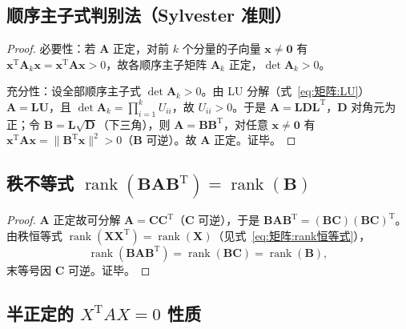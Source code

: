 \subsection*{顺序主子式判别法（Sylvester 准则）}

\begin{proof}
必要性：若 $\boldsymbol{A}$ 正定，对前 $k$ 个分量的子向量 $\boldsymbol{x}\neq\boldsymbol{0}$ 有 $\boldsymbol{x}^{\mathrm{T}}\boldsymbol{A}_k\boldsymbol{x} = \boldsymbol{x}^{\mathrm{T}}\boldsymbol{A}\boldsymbol{x} > 0$，故各顺序主子矩阵 $\boldsymbol{A}_k$ 正定，$\det\boldsymbol{A}_k > 0$。

充分性：设全部顺序主子式 $\det\boldsymbol{A}_k > 0$。由 LU 分解（式~\eqref{eq:矩阵:LU}）$\boldsymbol{A} = \boldsymbol{L}\boldsymbol{U}$，且 $\det\boldsymbol{A}_k = \prod_{i=1}^{k}U_{ii}$，故 $U_{ii}>0$。于是 $\boldsymbol{A} = \boldsymbol{L}\boldsymbol{D}\boldsymbol{L}^{\mathrm{T}}$，$\boldsymbol{D}$ 对角元为正；令 $\boldsymbol{B} = \boldsymbol{L}\sqrt{\boldsymbol{D}}$（下三角），则 $\boldsymbol{A} = \boldsymbol{B}\boldsymbol{B}^{\mathrm{T}}$，对任意 $\boldsymbol{x}\neq\boldsymbol{0}$ 有 $\boldsymbol{x}^{\mathrm{T}}\boldsymbol{A}\boldsymbol{x} = \|\boldsymbol{B}^{\mathrm{T}}\boldsymbol{x}\|^{2} > 0$（$\boldsymbol{B}$ 可逆）。故 $\boldsymbol{A}$ 正定。证毕。
\end{proof}

\subsection*{秩不等式 $\operatorname{rank}(\boldsymbol{B}\boldsymbol{A}\boldsymbol{B}^{\mathrm{T}}) = \operatorname{rank}(\boldsymbol{B})$}

\begin{proof}
$\boldsymbol{A}$ 正定故可分解 $\boldsymbol{A} = \boldsymbol{C}\boldsymbol{C}^{\mathrm{T}}$（$\boldsymbol{C}$ 可逆），于是 $\boldsymbol{B}\boldsymbol{A}\boldsymbol{B}^{\mathrm{T}} = (\boldsymbol{B}\boldsymbol{C})(\boldsymbol{B}\boldsymbol{C})^{\mathrm{T}}$。由秩恒等式 $\operatorname{rank}(\boldsymbol{X}\boldsymbol{X}^{\mathrm{T}}) = \operatorname{rank}(\boldsymbol{X})$（见式~\eqref{eq:矩阵:rank恒等式}），
\[
\operatorname{rank}(\boldsymbol{B}\boldsymbol{A}\boldsymbol{B}^{\mathrm{T}}) = \operatorname{rank}(\boldsymbol{B}\boldsymbol{C}) = \operatorname{rank}(\boldsymbol{B}),
\]
末等号因 $\boldsymbol{C}$ 可逆。证毕。
\end{proof}

\subsection*{半正定的 $X^{\mathrm{T}}AX = 0$ 性质}

